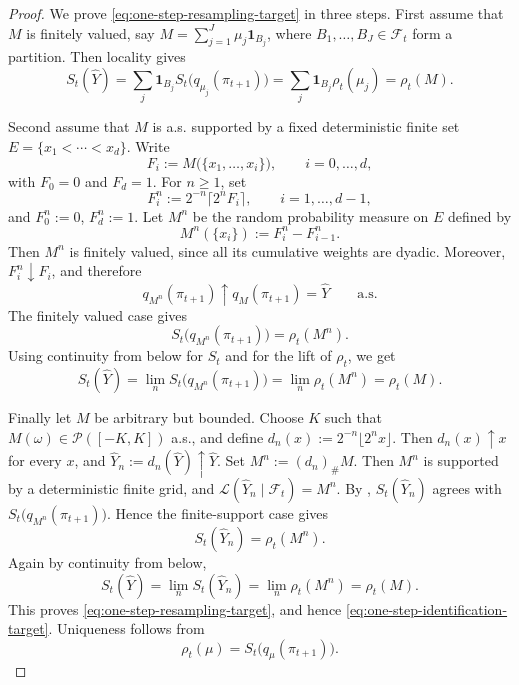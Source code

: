 \documentclass[10pt,a4paper]{amsart}
\newcommand{\F}{\mathcal{F}}
\newcommand{\Pc}{\mathcal P}
\newcommand{\law}{\mathcal{L}}
\begin{document}
\begin{proof}
We prove \eqref{eq:one-step-resampling-target} in three steps. First assume
that \(M\) is finitely valued, say
\(M=\sum_{j=1}^J\mu_j\mathbf 1_{B_j}\), where
\(B_1,\dots,B_J\in\F_t\) form a partition. Then locality gives
\[
S_t(\widehat Y)
=
\sum_j\mathbf 1_{B_j}S_t\big(q_{\mu_j}(\pi_{t+1})\big)
=
\sum_j\mathbf 1_{B_j}\rho_t(\mu_j)
=
\rho_t(M).
\]

Second assume that \(M\) is a.s. supported by a fixed deterministic finite set
\(E=\{x_1<\cdots<x_d\}\). Write
\[
F_i:=M\big(\{x_1,\dots,x_i\}\big),
\qquad i=0,\dots,d,
\]
with \(F_0=0\) and \(F_d=1\). For \(n\ge1\), set
\[
F_i^n:=2^{-n}\lceil 2^nF_i\rceil,
\qquad i=1,\dots,d-1,
\]
and \(F_0^n:=0\), \(F_d^n:=1\). Let \(M^n\) be the random probability measure
on \(E\) defined by
\[
M^n(\{x_i\}) := F_i^n-F_{i-1}^n.
\]
Then \(M^n\) is finitely valued, since all its cumulative weights are dyadic.
Moreover, \(F_i^n\downarrow F_i\), and therefore
\[
q_{M^n}(\pi_{t+1})\uparrow q_M(\pi_{t+1})=\widehat Y
\qquad\text{a.s.}
\]
The finitely valued case gives
\[
S_t\big(q_{M^n}(\pi_{t+1})\big)=\rho_t(M^n).
\]
Using continuity from below for \(S_t\) and for the lift of \(\rho_t\), we get
\[
S_t(\widehat Y)
=
\lim_n S_t\big(q_{M^n}(\pi_{t+1})\big)
=
\lim_n \rho_t(M^n)
=
\rho_t(M).
\]

Finally let \(M\) be arbitrary but bounded. Choose \(K\) such that
\(M(\omega)\in\Pc([-K,K])\) a.s., and define
\(d_n(x):=2^{-n}\lfloor 2^nx\rfloor\). Then \(d_n(x)\uparrow x\) for every
\(x\), and \(\widehat Y_n:=d_n(\widehat Y)\uparrow \widehat Y\). Set
\(M^n:=(d_n)_\#M\). Then \(M^n\) is supported by a deterministic finite grid,
and \(\law(\widehat Y_n\mid\F_t)=M^n\). By
, \(S_t(\widehat Y_n)\) agrees with
\(S_t\big(q_{M^n}(\pi_{t+1})\big)\). Hence the finite-support case gives
\[
S_t(\widehat Y_n)=\rho_t(M^n).
\]
Again by continuity from below,
\[
S_t(\widehat Y)
=
\lim_n S_t(\widehat Y_n)
=
\lim_n \rho_t(M^n)
=
\rho_t(M).
\]
This proves \eqref{eq:one-step-resampling-target}, and hence
\eqref{eq:one-step-identification-target}. Uniqueness follows from
\[
\rho_t(\mu)=S_t\big(q_\mu(\pi_{t+1})\big).
\]
\end{proof}
\end{document}
